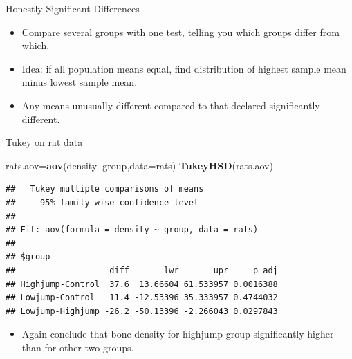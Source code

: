 \documentclass[ignorenonframetext,]{beamer}
\newenvironment{Shaded}{\begin{snugshade}}{\end{snugshade}}
\newcommand{\DataTypeTok}[1]{\textcolor[rgb]{0.13,0.29,0.53}{#1}}
\newcommand{\KeywordTok}[1]{\textcolor[rgb]{0.13,0.29,0.53}{\textbf{#1}}}
\newcommand{\NormalTok}[1]{#1}
\newcommand{\OperatorTok}[1]{\textcolor[rgb]{0.81,0.36,0.00}{\textbf{#1}}}
\providecommand{\tightlist}{%
  \setlength{\itemsep}{0pt}\setlength{\parskip}{0pt}}
\begin{document}
\begin{frame}{Honestly Significant Differences}
\protect\hypertarget{honestly-significant-differences}{}

\begin{itemize}
\tightlist
\item
  Compare several groups with one test, telling you which groups differ
  from which.
\item
  Idea: if all population means equal, find distribution of highest
  sample mean minus lowest sample mean.
\item
  Any means unusually different compared to that declared significantly
  different.
\end{itemize}

\end{frame}

\begin{frame}[fragile]{Tukey on rat data}
\protect\hypertarget{tukey-on-rat-data}{}

\small

\begin{Shaded}
\begin{Highlighting}[]
\NormalTok{rats.aov=}\KeywordTok{aov}\NormalTok{(density}\OperatorTok{~}\NormalTok{group,}\DataTypeTok{data=}\NormalTok{rats)}
\KeywordTok{TukeyHSD}\NormalTok{(rats.aov)}
\end{Highlighting}
\end{Shaded}

\begin{verbatim}
##   Tukey multiple comparisons of means
##     95% family-wise confidence level
## 
## Fit: aov(formula = density ~ group, data = rats)
## 
## $group
##                   diff       lwr       upr     p adj
## Highjump-Control  37.6  13.66604 61.533957 0.0016388
## Lowjump-Control   11.4 -12.53396 35.333957 0.4744032
## Lowjump-Highjump -26.2 -50.13396 -2.266043 0.0297843
\end{verbatim}

\normalsize

\begin{itemize}
\tightlist
\item
  Again conclude that bone density for highjump group significantly
  higher than for other two groups.
\end{itemize}

\end{frame}
\end{document}
